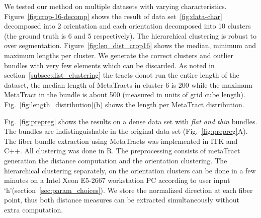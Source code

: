 






We tested our method on multiple datasets with varying characteristics. 
Figure~\ref{fig:crop-16-decomp} shows the result of data set~\ref{fig:data-char} decomposed into 2 orientation and each orientation decomposed into 10 clusters (the ground truth is 6 and 5 respectively). The hierarchical clustering is robust to over segmentation.
Figure~\ref{fig:len_dist_crop16} shows the median, minimum and maximum lengths per cluster. We generate the correct clusters and outlier bundles with very few elements which can be discarded. As noted in section~\ref{subsec:dist_clustering} the tracts donot run the entire length of the dataset, the median length of MetaTracts in cluster 6 is 200 while the maximum MetaTract in the bundle is about 500 (measured in units of grid cube length). Fig.~\ref{fig:length_distribution}(b) shows the length per MetaTract distribution.

Fig.~\ref{fig:prepreg} shows the results on a dense data set with \textit{flat and thin} bundles. The bundles are indistinguishable in the original data set (Fig.~\ref{fig:prepreg}A).
The fiber bundle extraction using MetaTracts was implemented in ITK and C++. All clustering was done in R. The preprocessing consists of metaTract generation the distance computation and the orientation clustering. The hierarchical clustering separately,  on the orientation clusters can be done in a few minutes on a Intel Xeon E5-2667 workstation PC according to user input `h'(section~\ref{sec:param_choices}). We store the normalized direction at each fiber point, thus both distance measures can be extracted simultaneously without extra computation.



